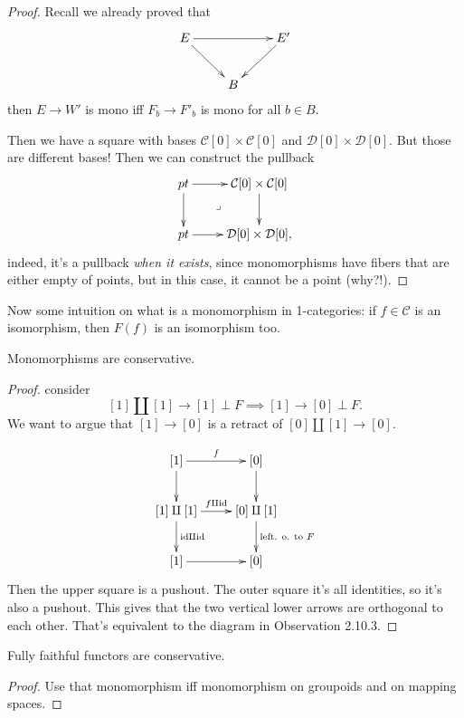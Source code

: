 \begin{proof}
Recall we already proved that
$$
\xymatrix{
E \ar[rd] \ar[rr] && E' \ar[dl] \\
& B
}
$$
then $E \to W'$ is mono iff $F_b \to F'_b$ is
mono for all $b \in B$.

Then we have a square with bases
$\mathcal{C}[0] \times \mathcal{C}[0]$
and $\mathcal{D}[0]\times \mathcal{D}[0]$.
But those are different bases!
Then we can construct the pullback
$$
\xymatrix{
pt\ar[r]\ar[d]\ar@{}[dr]|-{\lrcorner}&
\mathcal{C}[0]\times\mathcal{C}[0]\ar[d]\\
pt\ar[r]&\mathcal{D}[0]\times\mathcal{D}[0],
}
$$
indeed, it's a pullback {\it when it exists},
since
monomorphisms have fibers that are either
empty of points,
but in this case, it cannot be a point
(why?!).
\end{proof}

\noindent
Now some intuition on what is a monomorphism
in 1-categories:
if $f\in \mathcal{C}$ is an isomorphism, then
$F(f)$ is an isomorphism too.

\begin{lemma}
\label{lemma-monomorphisms-are-conservative}
Monomorphisms are conservative.
\end{lemma}

\begin{proof}
consider
$$
[1] \amalg [1] \to [1] \perp F \implies  [1]
\to [0] \perp F.
$$
We want to argue that $[1] \to [0]$ is a
retract of
$[0] \amalg [1]\to [0]$.

$$
\xymatrix{
[1]\ar[d]\ar[r]^f&[0]\ar[d]\\
[1] \amalg [1]\ar[r]^{f \amalg
\text{id}}\ar[d]^{\text{id} \amalg
\text{id}}&
[0] \amalg[1]\ar[d]^{\text{left. o. to }F}\\
[1]\ar[r]& [0]
}
$$
Then the upper square is a pushout.
The outer square it's all identities, so it's
also a pushout.
This gives that the two vertical lower arrows
are orthogonal to each other.
That's equivalent to the diagram in
Observation 2.10.3.
\end{proof}

\begin{lemma}
\label{lemma-fully-faithful-are-conservative}
Fully faithful functors are conservative.
\end{lemma}

\begin{proof}
Use that monomorphism iff monomorphism on
groupoids
and on mapping spaces.
\end{proof}

